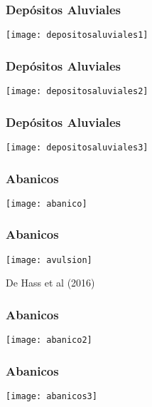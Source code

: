 \documentclass{beamer}
\begin{document}
\begin{frame}
\frametitle{Depósitos Aluviales}
\begin{center}
   	\texttt{[image: depositosaluviales1]}
\end{center}
\end{frame}
\begin{frame}
\frametitle{Depósitos Aluviales}
\begin{center}
   	\texttt{[image: depositosaluviales2]}
\end{center}
\end{frame}
\begin{frame}
\frametitle{Depósitos Aluviales}
\begin{center}
   	\texttt{[image: depositosaluviales3]}
\end{center}
\end{frame}
\begin{frame}
\frametitle{Abanicos}
\begin{center}
   	\texttt{[image: abanico]}
\end{center}
\end{frame}
\begin{frame}
\frametitle{Abanicos}
\begin{center}
   	\texttt{[image: avulsion]}
\end{center}
\tiny{De Hass et al (2016)}
\end{frame}
\begin{frame}
\frametitle{Abanicos}
\begin{center}
   	\texttt{[image: abanico2]}
\end{center}
\end{frame}
\begin{frame}
\frametitle{Abanicos}
\begin{center}
   	\texttt{[image: abanicos3]}
\end{center}
\end{frame}
\end{document}
